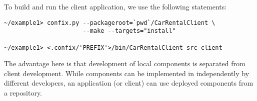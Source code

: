 To build and run the client application, we use the following statements:
\begin{small}
\begin{verbatim}
~/example1> confix.py --packageroot=`pwd`/CarRentalClient \
                      --make --targets="install"

~/example1> <.confix/'PREFIX'>/bin/CarRentalClient_src_client
\end{verbatim}
\end{small}


The advantage here is that development of local components is separated from
client development. 
While components can be implemented in independently by different developers, an
application (or client) can use deployed components from a repository.


